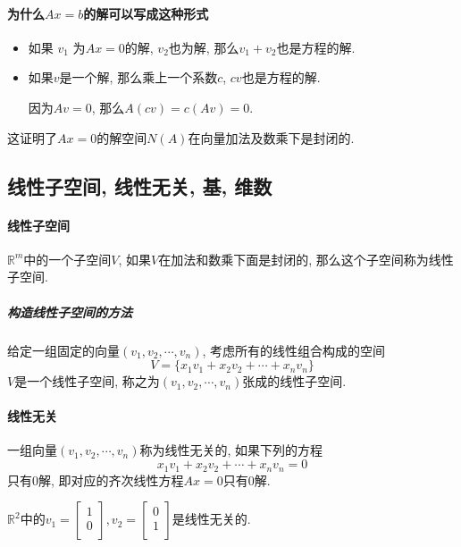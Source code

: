\paragraph{为什么$Ax=b$的解可以写成这种形式}

\begin{itemize}
    \item 如果 $v_1$ 为$Ax=0$的解, $v_2$也为解, 那么$v_1+v_2$也是方程的解.
    
    \item 如果$v$是一个解, 那么乘上一个系数$c$, $cv$也是方程的解.

    因为$Av=0$, 那么$A (cv) = c (Av) = 0$.
\end{itemize}

这证明了$Ax=0$的解空间$N(A)$在向量加法及数乘下是封闭的.

\subsection[一些概念]{线性子空间, 线性无关, 基, 维数}

\paragraph{线性子空间}
$\mathbb{R}^{m}$中的一个子空间$V$, 如果$V$在加法和数乘下面是封闭的, 那么这个子空间称为线性子空间.
\subparagraph{构造线性子空间的方法}
给定一组固定的向量$(v_1,v_2, \cdots ,v_n)$, 考虑所有的线性组合构成的空间
\begin{equation}
  V = \{ x_1 v_1 + x_2v_2 + \cdots + x_n v_n \}
\end{equation}
$V$是一个线性子空间, 称之为$(v_1, v_2, \cdots , v_n)$张成的线性子空间.

\paragraph{线性无关}
\begin{definition}
    一组向量$(v_1,v_2, \cdots, v_n)$称为线性无关的, 如果下列的方程
    \begin{equation}
      x_1v_1+x_2v_2+ \cdots  +x_n v_n = 0
    \end{equation}
    只有$0$解, 即对应的齐次线性方程$Ax=0$只有$0$解.
\end{definition}

\begin{example}
    $\mathbb{R}^{2}$中的$v_1 = \begin{bmatrix}
     1\\
     0\\
    \end{bmatrix}, v_2 = \begin{bmatrix}
     0\\
     1\\
    \end{bmatrix}$是线性无关的.
\end{example}

